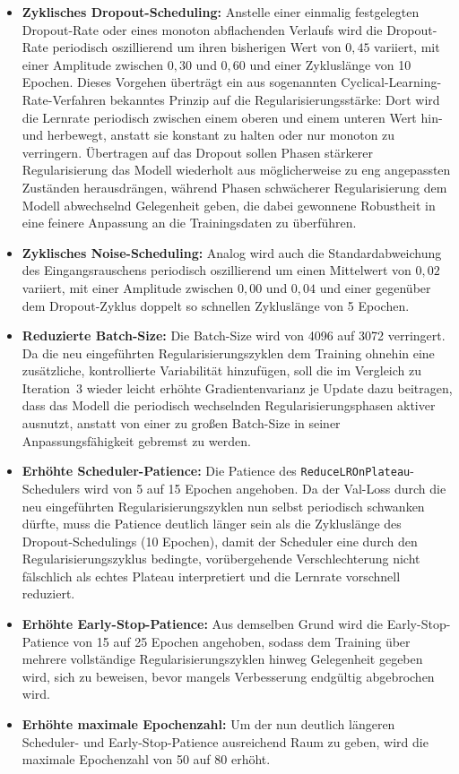 \begin{itemize}
    \item \textbf{Zyklisches Dropout-Scheduling:} Anstelle einer einmalig festgelegten Dropout-Rate oder eines monoton abflachenden Verlaufs wird die Dropout-Rate periodisch oszillierend um ihren bisherigen Wert von $0{,}45$ variiert, mit einer Amplitude zwischen $0{,}30$ und $0{,}60$ und einer Zykluslänge von 10 Epochen. Dieses Vorgehen überträgt ein aus sogenannten Cyclical-Learning-Rate-Verfahren bekanntes Prinzip auf die Regularisierungsstärke: Dort wird die Lernrate periodisch zwischen einem oberen und einem unteren Wert hin- und herbewegt, anstatt sie konstant zu halten oder nur monoton zu verringern. Übertragen auf das Dropout sollen Phasen stärkerer Regularisierung das Modell wiederholt aus möglicherweise zu eng angepassten Zuständen herausdrängen, während Phasen schwächerer Regularisierung dem Modell abwechselnd Gelegenheit geben, die dabei gewonnene Robustheit in eine feinere Anpassung an die Trainingsdaten zu überführen.
    \item \textbf{Zyklisches Noise-Scheduling:} Analog wird auch die Standardabweichung des Eingangsrauschens periodisch oszillierend um einen Mittelwert von $0{,}02$ variiert, mit einer Amplitude zwischen $0{,}00$ und $0{,}04$ und einer gegenüber dem Dropout-Zyklus doppelt so schnellen Zykluslänge von 5 Epochen.
    \item \textbf{Reduzierte Batch-Size:} Die Batch-Size wird von 4096 auf 3072 verringert. Da die neu eingeführten Regularisierungszyklen dem Training ohnehin eine zusätzliche, kontrollierte Variabilität hinzufügen, soll die im Vergleich zu Iteration~3 wieder leicht erhöhte Gradientenvarianz je Update dazu beitragen, dass das Modell die periodisch wechselnden Regularisierungsphasen aktiver ausnutzt, anstatt von einer zu großen Batch-Size in seiner Anpassungsfähigkeit gebremst zu werden.
    \item \textbf{Erhöhte Scheduler-Patience:} Die Patience des \texttt{ReduceLROnPlateau}-Schedulers wird von 5 auf 15 Epochen angehoben. Da der Val-Loss durch die neu eingeführten Regularisierungszyklen nun selbst periodisch schwanken dürfte, muss die Patience deutlich länger sein als die Zykluslänge des Dropout-Schedulings (10 Epochen), damit der Scheduler eine durch den Regularisierungszyklus bedingte, vorübergehende Verschlechterung nicht fälschlich als echtes Plateau interpretiert und die Lernrate vorschnell reduziert.
    \item \textbf{Erhöhte Early-Stop-Patience:} Aus demselben Grund wird die Early-Stop-Patience von 15 auf 25 Epochen angehoben, sodass dem Training über mehrere vollständige Regularisierungszyklen hinweg Gelegenheit gegeben wird, sich zu beweisen, bevor mangels Verbesserung endgültig abgebrochen wird.
    \item \textbf{Erhöhte maximale Epochenzahl:} Um der nun deutlich längeren Scheduler- und Early-Stop-Patience ausreichend Raum zu geben, wird die maximale Epochenzahl von 50 auf 80 erhöht.
\end{itemize}

